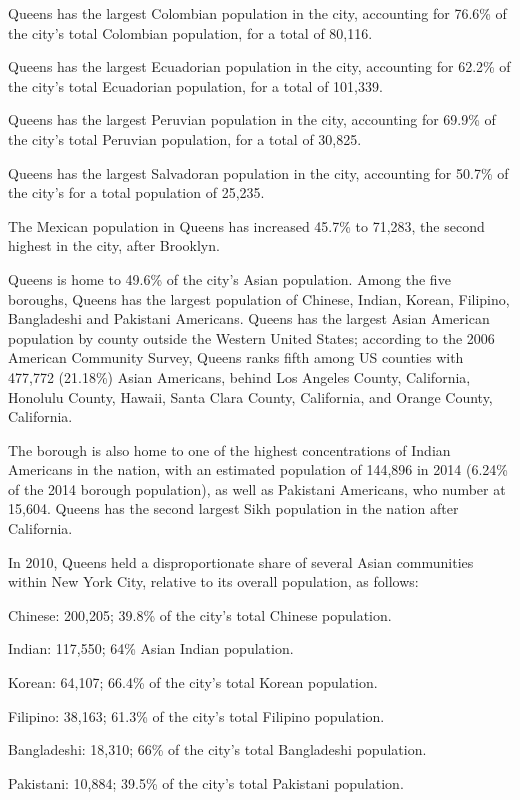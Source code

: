 Queens has the largest Colombian population in the city, accounting for
76.6\% of the city's total Colombian population, for a total of 80,116.

Queens has the largest Ecuadorian population in the city, accounting for
62.2\% of the city's total Ecuadorian population, for a total of
101,339.

Queens has the largest Peruvian population in the city, accounting for
69.9\% of the city's total Peruvian population, for a total of 30,825.

Queens has the largest Salvadoran population in the city, accounting for
50.7\% of the city's for a total population of 25,235.

The Mexican population in Queens has increased 45.7\% to 71,283, the
second highest in the city, after Brooklyn.

Queens is home to 49.6\% of the city's Asian population. Among the five
boroughs, Queens has the largest population of Chinese, Indian, Korean,
Filipino, Bangladeshi and Pakistani Americans. Queens has the largest
Asian American population by county outside the Western United States;
according to the 2006 American Community Survey, Queens ranks fifth
among US counties with 477,772 (21.18\%) Asian Americans, behind Los
Angeles County, California, Honolulu County, Hawaii, Santa Clara County,
California, and Orange County, California.

The borough is also home to one of the highest concentrations of Indian
Americans in the nation, with an estimated population of 144,896 in 2014
(6.24\% of the 2014 borough population), as well as Pakistani Americans,
who number at 15,604. Queens has the second largest Sikh population in
the nation after California.

In 2010, Queens held a disproportionate share of several Asian
communities within New York City, relative to its overall population, as
follows:

Chinese: 200,205; 39.8\% of the city's total Chinese population.

Indian: 117,550; 64\% Asian Indian population.

Korean: 64,107; 66.4\% of the city's total Korean population.

Filipino: 38,163; 61.3\% of the city's total Filipino population.

Bangladeshi: 18,310; 66\% of the city's total Bangladeshi population.

Pakistani: 10,884; 39.5\% of the city's total Pakistani population.

